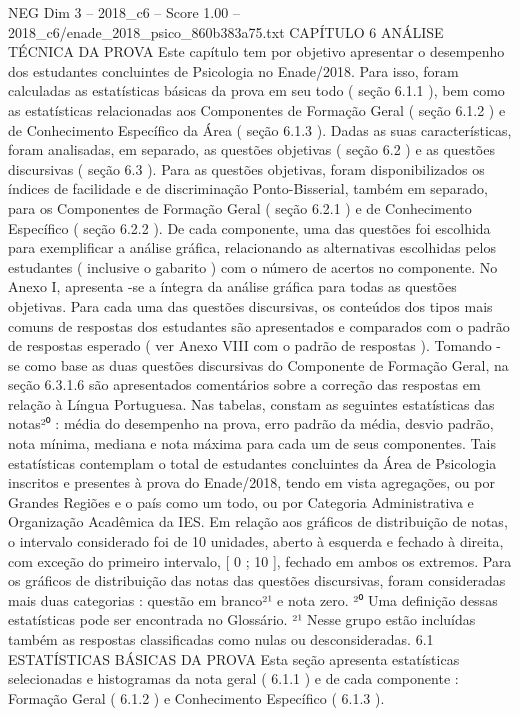 \begin{textsample}{NEG Dim 3 – 2018\_c6 – Score 1.00 – 2018\_c6/enade\_2018\_psico\_860b383a75.txt}  \label{ex:f3_neg_172}
CAPÍTULO 6 ANÁLISE TÉCNICA DA PROVA Este capítulo tem por objetivo apresentar o desempenho dos estudantes concluintes de Psicologia no Enade/2018.
Para isso, foram calculadas as estatísticas básicas da prova em seu todo ( seção 6.1.1 ), bem como as estatísticas relacionadas aos Componentes de Formação Geral ( seção 6.1.2 ) e de Conhecimento Específico da Área ( seção 6.1.3 ).
Dadas as suas características, foram analisadas, em separado, as questões objetivas ( seção 6.2 ) e as questões discursivas ( seção 6.3 ).
Para as questões objetivas, foram disponibilizados os índices de facilidade e de discriminação Ponto-Bisserial, também em separado, para os Componentes de Formação Geral ( seção 6.2.1 ) e de Conhecimento Específico ( seção 6.2.2 ).
De cada componente, uma das questões foi escolhida para exemplificar a análise gráfica, relacionando as alternativas escolhidas pelos estudantes ( inclusive o gabarito ) com o número de acertos no componente.
No Anexo I, apresenta -se a íntegra da análise gráfica para todas as questões objetivas.
Para cada uma das questões discursivas, os conteúdos dos tipos mais comuns de respostas dos estudantes são apresentados e comparados com o padrão de respostas esperado ( ver Anexo VIII com o padrão de respostas ).
Tomando -se como base as duas questões discursivas do Componente de Formação Geral, na seção 6.3.1.6 são apresentados comentários sobre a correção das respostas em relação à Língua Portuguesa.
Nas tabelas, constam as seguintes estatísticas das notas²⁰ : média do desempenho na prova, erro padrão da média, desvio padrão, nota mínima, mediana e nota máxima para cada um de seus componentes.
Tais estatísticas contemplam o total de estudantes concluintes da Área de Psicologia inscritos e presentes à prova do Enade/2018, tendo em vista agregações, ou por Grandes Regiões e o país como um todo, ou por Categoria Administrativa e Organização Acadêmica da IES.
Em relação aos gráficos de distribuição de notas, o intervalo considerado foi de 10 unidades, aberto à esquerda e fechado à direita, com exceção do primeiro intervalo, [ 0 ; 10 ], fechado em ambos os extremos.
Para os gráficos de distribuição das notas das questões discursivas, foram consideradas mais duas categorias : questão em branco²¹ e nota zero. ²⁰ Uma definição dessas estatísticas pode ser encontrada no Glossário. ²¹ Nesse grupo estão incluídas também as respostas classificadas como nulas ou desconsideradas. 6.1 ESTATÍSTICAS BÁSICAS DA PROVA Esta seção apresenta estatísticas selecionadas e histogramas da nota geral ( 6.1.1 ) e de cada componente : Formação Geral ( 6.1.2 ) e Conhecimento Específico ( 6.1.3 ).

\end{textsample}
